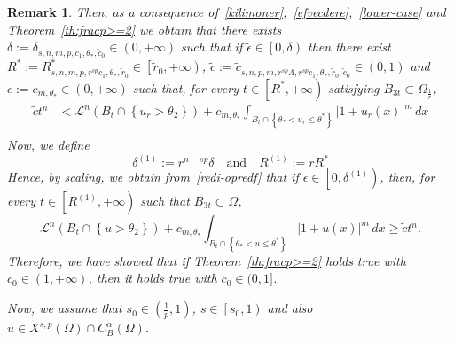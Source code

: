 \documentclass[12pt]{article}
\numberwithin{equation}{section}
\newtheorem{rem}[thm]{Remark}
\renewcommand{\leq}{\leqslant}
\renewcommand{\geq}{\geqslant}
\begin{document}
\begin{rem}
{Then, as a consequence of~\eqref{kilimoner},~\eqref{efvecdere},~\eqref{lower-case} and Theorem~\ref{th:fracp>=2} we obtain that there exists~$\delta:=\delta_{s,n,m,p,c_1,\theta_*,\tilde{c}_0}\in (0,+\infty)$ such that if $\tilde{\epsilon}\in \left[0,\delta\right)$ then
there exist~$R^{*}:=R_{s,n,m,p,r^{sp}c_1,\theta_*,\tilde{r}_0}^{*}\in \left[\tilde{r}_0,+\infty\right)$, $\tilde{c}:=\tilde{c}_{s,n,p,m,r^{sp}\Lambda,r^{sp}c_1,\theta_*,\tilde{r}_0,\tilde{c}_0}\in (0,1)$ and $c:=c_{m,\theta_*}\in(0,+\infty)$ such that, for every $t\in \left[R^*,+\infty\right)$ satisfying $B_{3t}\subset \Omega_\frac{1}{r}$,
\begin{equation}\label{redi-opredf}
\begin{split}
\tilde{c}t^n &<\mathcal{L}^n(B_t\cap \left\lbrace u_r>\theta_2 \right\rbrace)+c_{m,\theta_*}\int_{B_t\cap \left\lbrace \theta_{*}< u_r\leq \theta^* \right\rbrace}\left|1+u_r(x)\right|^m\,dx\\
\end{split}
\end{equation} 
Now, we define 
\begin{equation*}
\delta^{(1)}:= r^{n-sp}\delta \quad\mbox{and}\quad  R^{(1)}:=r R^{*}
\end{equation*}
Hence, by scaling, we obtain from~\eqref{redi-opredf} that if $\epsilon\in \left[0,\delta^{(1)}\right)$, then, for every $t\in \left[R^{(1)},+\infty\right)$ such that $B_{3t}\subset \Omega$,
\begin{equation*}
\mathcal{L}^n\left( B_{t}\cap \left\lbrace u>\theta_2 \right\rbrace\right)+ c_{m,\theta_*}\int_{B_{t}\cap \left\lbrace \theta_{*}< u \leq \theta^* \right\rbrace}\left|1+u(x)\right|^m\,dx \geq \tilde{c} t^n. 
\end{equation*}
Therefore, we have showed that if Theorem~\ref{th:fracp>=2} holds true with $c_0\in (1,+\infty)$, then it holds true with $c_0\in (0,1]$.  


Now, we  assume that $s_0\in \left(\frac{1}{p},1\right)$, $s\in\left[s_0,1\right)$ and also $u\in X^{s,p}(\Omega)\cap C_B^\alpha(\Omega)$. 

}
\end{rem}
\end{document}
